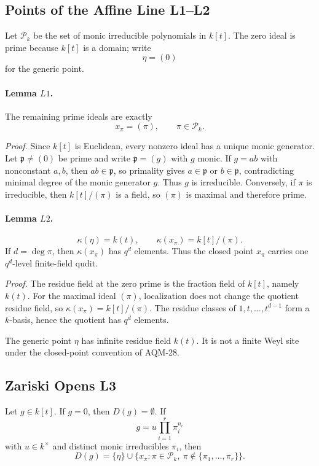 \subsection{Points of the Affine Line L1--L2}

Let \(\mathcal P_k\) be the set of monic irreducible polynomials in \(k[t]\).
The zero ideal is prime because \(k[t]\) is a domain; write
\[
  \eta=(0)
\]
for the generic point.

\paragraph{Lemma \(L1\).}
The remaining prime ideals are exactly
\[
  x_\pi=(\pi),\qquad \pi\in\mathcal P_k.
\]

\emph{Proof.}
Since \(k[t]\) is Euclidean, every nonzero ideal has a unique monic generator.
Let \(\mathfrak p\ne(0)\) be prime and write \(\mathfrak p=(g)\) with \(g\)
monic.  If \(g=ab\) with nonconstant \(a,b\), then \(ab\in\mathfrak p\), so
primality gives \(a\in\mathfrak p\) or \(b\in\mathfrak p\), contradicting
minimal degree of the monic generator \(g\).  Thus \(g\) is irreducible.
Conversely, if \(\pi\) is irreducible, then \(k[t]/(\pi)\) is a field, so
\((\pi)\) is maximal and therefore prime.

\paragraph{Lemma \(L2\).}
\[
  \kappa(\eta)=k(t),\qquad
  \kappa(x_\pi)=k[t]/(\pi).
\]
If \(d=\deg\pi\), then \(\kappa(x_\pi)\) has \(q^d\) elements.  Thus the
closed point \(x_\pi\) carries one \(q^d\)-level finite-field qudit.

\emph{Proof.}
The residue field at the zero prime is the fraction field of \(k[t]\), namely
\(k(t)\).  For the maximal ideal \((\pi)\), localization does not change the
quotient residue field, so \(\kappa(x_\pi)=k[t]/(\pi)\).  The residue classes
of \(1,t,\ldots,t^{d-1}\) form a \(k\)-basis, hence the quotient has \(q^d\)
elements.

The generic point \(\eta\) has infinite residue field \(k(t)\).  It is not a
finite Weyl site under the closed-point convention of AQM-28.

\subsection{Zariski Opens L3}

Let \(g\in k[t]\).  If \(g=0\), then \(D(g)=\emptyset\).  If
\[
  g=u\prod_{i=1}^r\pi_i^{n_i}
\]
with \(u\in k^\times\) and distinct monic irreducibles \(\pi_i\), then
\[
  D(g)=\{\eta\}\cup
  \{x_\pi:\pi\in\mathcal P_k,\ \pi\notin\{\pi_1,\ldots,\pi_r\}\}.
\]

